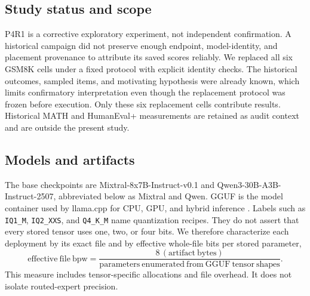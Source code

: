 \documentclass[11pt]{article}
\newcommand{\q}[1]{\texttt{#1}}
\begin{document}
\subsection{Study status and scope}

P4R1 is a corrective exploratory experiment, not independent confirmation.
A historical campaign did not preserve enough endpoint, model-identity, and
placement provenance to attribute its saved scores reliably. We replaced all
six GSM8K cells under a fixed protocol with explicit identity checks. The
historical outcomes, sampled items, and motivating hypothesis were already
known, which limits confirmatory interpretation even though the replacement
protocol was frozen before execution. Only these six replacement cells
contribute results. Historical MATH and HumanEval+ measurements are retained
as audit context and are outside the present study.

\subsection{Models and artifacts}

The base checkpoints are Mixtral-8x7B-Instruct-v0.1 and
Qwen3-30B-A3B-Instruct-2507, abbreviated below as Mixtral and Qwen.
GGUF is the model container used by llama.cpp for CPU, GPU, and hybrid
inference \citep{gerganov2023llamacpp}. Labels such as \q{IQ1\_M},
\q{IQ2\_XXS}, and \q{Q4\_K\_M} name quantization recipes. They do not assert
that every stored tensor uses one, two, or four bits. We therefore characterize
each deployment by its exact file and by effective whole-file bits per stored
parameter,
\begin{equation}
  \mathrm{effective\ file\ bpw}
  = \frac{8\,(\mathrm{artifact\ bytes})}
           {\mathrm{parameters\ enumerated\ from\ GGUF\ tensor\ shapes}}.
\end{equation}
This measure includes tensor-specific allocations and file overhead. It does
not isolate routed-expert precision.
\end{document}
